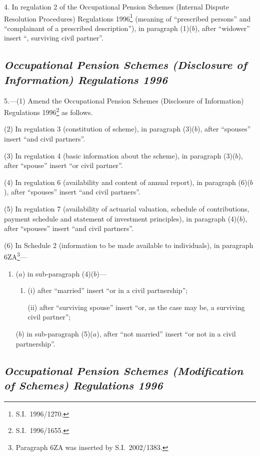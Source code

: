 \documentclass[12pt,a4paper]{article}
\begin{document}
4.  In regulation 2 of the Occupational Pension Schemes (Internal Dispute Resolution Procedures) Regulations 1996\footnote{S.I.\ 1996/1270.} (meaning of “prescribed persons” and “complainant of a prescribed description”), in paragraph (1)($b$), after “widower” insert “, surviving civil partner”.

\subsection*{\itshape Occupational Pension Schemes (Disclosure of Information) Regulations 1996}

5.---(1)  Amend the Occupational Pension Schemes (Disclosure of Information) Regulations 1996\footnote{S.I.\ 1996/1655.} as follows.

(2) In regulation 3 (constitution of scheme), in paragraph (3)($b$), after “spouses” insert “and civil partners”.

(3) In regulation 4 (basic information about the scheme), in paragraph (3)($b$), after “spouse” insert “or civil partner”.

(4) In regulation 6 (availability and content of annual report), in paragraph (6)($b$), after “spouses” insert “and civil partners”.

(5) In regulation 7 (availability of actuarial valuation, schedule of contributions, payment schedule and statement of investment principles), in paragraph (4)($b$), after “spouses” insert “and civil partners”.

(6) In Schedule 2 (information to be made available to individuals), in paragraph 6ZA\footnote{Paragraph 6ZA was inserted by S.I.\ 2002/1383.}—
\begin{enumerate}\item[]
($a$) in sub-paragraph (4)($b$)—
\begin{enumerate}\item[]
(i) after “married” insert “or in a civil partnership”;

(ii) after “surviving spouse” insert “or, as the case may be, a surviving civil partner”;
\end{enumerate}

($b$) in sub-paragraph (5)($a$), after “not married” insert “or not in a civil partnership”.
\end{enumerate}

\subsection*{\itshape\sloppy Occupational Pension Schemes (Modification of Schemes) Regulations 1996}
\end{document}
